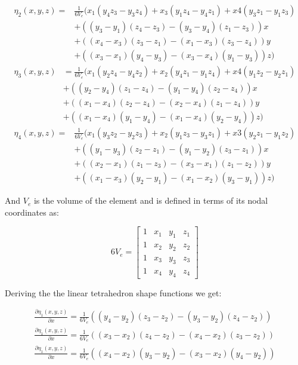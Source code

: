 \documentclass[12pt]{article}
\begin{document}
\begin{align*}
\eta_2(x,y,z)=&\frac{1}{6V_e}(
x_1(y_4z_3-y_3z_4)+x_3(y_1z_4-y_4z_1)+x4(y_3z_1-y_1z_3) \\
&+ ((y_3-y_1)(z_4-z_3)-(y_3-y_4)(z_1-z_3))x \\
&+ ((x_4-x_3)(z_3-z_1)-(x_1-x_3)(z_3-z_4))y \\
&+ ((x_3-x_1)(y_4-y_3)-(x_3-x_4)(y_1-y_3))z)
\end{align*}
\begin{align*}
\eta_3(x,y,z)&=\frac{1}{6V_e}(
x_1(y_2z_4-y_4z_2)+x_2(y_4z_1-y_1z_4)+x4(y_1z_2-y_2z_1) \\
&+ ((y_2-y_4)(z_1-z_4)-(y_1-y_4)(z_2-z_4))x \\
&+ ((x_1-x_4)(z_2-z_4)-(x_2-x_4)(z_1-z_4))y \\
&+ ((x_1-x_4)(y_1-y_4)-(x_1-x_4)(y_2-y_4))z)
\end{align*}
\begin{align*}
\eta_4(x,y,z)=&\frac{1}{6V_e}(
x_1(y_3z_2-y_2z_3)+x_2(y_1z_3-y_3z_1)+x3(y_2z_1-y_1z_2) \\
&+ ((y_1-y_3)(z_2-z_1)-(y_1-y_2)(z_3-z_1))x \\
&+ ((x_2-x_1)(z_1-z_3)-(x_3-x_1)(z_1-z_2))y \\
&+ ((x_1-x_3)(y_2-y_1)-(x_1-x_2)(y_3-y_1))z)
\end{align*}

And $V_e$ is the volume of the element and is defined in terms of its nodal coordinates as:

\begin{equation}
6V_e=\begin{bmatrix} 1 & x_1 & y_1 & z_1  \\ 1 & x_2 & y_2 & z_2  \\ 1 & x_3 & y_3 & z_3 \\ 1 & x_4 & y_4 & z_4 \end{bmatrix}
\end{equation}

Deriving the the linear tetrahedron shape functions we get:

\begin{align*}
\frac{\partial \eta_1(x,y,z)}{\partial x} = \frac{1}{6V_e}((y_4-y_2)(z_3-z_2)-(y_3-y_2)(z_4-z_2)) \\
\frac{\partial \eta_1(x,y,z)}{\partial x} = \frac{1}{6V_e}((x_3-x_2)(z_4-z_2)-(x_4-x_2)(z_3-z_2)) \\
\frac{\partial \eta_1(x,y,z)}{\partial x} = \frac{1}{6V_e}((x_4-x_2)(y_3-y_2)-(x_3-x_2)(y_4-y_2))
\end{align*}
\end{document}
